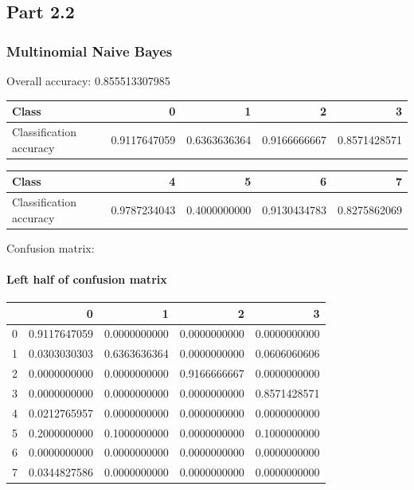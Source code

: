 \subsection{Part 2.2}
\subsubsection{Multinomial Naive Bayes}
Overall accuracy: 0.855513307985

\begin{tabular}{l|r|r|r|r}
Class & 0 & 1 & 2 & 3 \\
\hline
Classification accuracy & 0.9117647059 & 0.6363636364 & 0.9166666667 & 0.8571428571 \\
\end{tabular}

\begin{tabular}{l|r|r|r|r}
Class & 4 & 5 & 6 & 7 \\
\hline
Classification accuracy & 0.9787234043 & 0.4000000000 & 0.9130434783 & 0.8275862069 \\
\end{tabular}

Confusion matrix:

\paragraph{Left half of confusion matrix}
\begin{tabular}{l|r|r|r|r}
 & 0 & 1 & 2 & 3 \\
\hline
0 & 0.9117647059 & 0.0000000000 & 0.0000000000 & 0.0000000000 \\
1 & 0.0303030303 & 0.6363636364 & 0.0000000000 & 0.0606060606 \\
2 & 0.0000000000 & 0.0000000000 & 0.9166666667 & 0.0000000000 \\
3 & 0.0000000000 & 0.0000000000 & 0.0000000000 & 0.8571428571 \\
4 & 0.0212765957 & 0.0000000000 & 0.0000000000 & 0.0000000000 \\
5 & 0.2000000000 & 0.1000000000 & 0.0000000000 & 0.1000000000 \\
6 & 0.0000000000 & 0.0000000000 & 0.0000000000 & 0.0000000000 \\
7 & 0.0344827586 & 0.0000000000 & 0.0000000000 & 0.0000000000 \\
\end{tabular}

